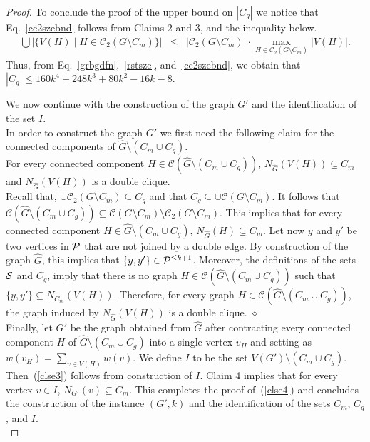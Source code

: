 \documentclass[a4paper,11pt]{article}
\newcommand{\cc}{{\mathcal{C}}}
\newcommand{\cupall}{\pmb{\pmb{\cup}}}
\begin{document}
\begin{proof}
\noindent To conclude the proof of the upper bound on $|C_{g}|$ we notice that Eq.~\eqref{cc2szebnd} follows from Claims 2 and 3, and the inequality below.
\begin{eqnarray*}
\bigcup |\{V(H)\mid H\in \cc_{2}(G\setminus C_{m})\}| & \leq & |\cc_{2}(G\setminus C_{m})|\cdot \max_{H\in \cc_{2}(G\setminus C_{m})}|V(H)|.
\end{eqnarray*}
Thus, from Eq.~\eqref{grbgdfn},~\eqref{rstsze}, and~\eqref{cc2szebnd}, we obtain that $|C_{g}|\leq 160k^{4}+248k^{3}+80k^{2}-16k-8$.


\medskip

We now continue with the construction of the graph $G'$ and the identification of the set $I$.\\

\noindent In order to construct the graph $G'$ we first need the following claim for the connected components of $\widehat{G}\setminus (C_{m}\cup C_{g})$.\\

 For every connected component $H\in \cc(\widehat{G}\setminus (C_{m}\cup C_{g}))$, $N_{\widehat{G}}(V(H))\subseteq C_{m}$ and
$N_{\widehat{G}}(V(H))$ is a double clique.\\

 Recall that, $\cupall \cc_{2}(G\setminus C_{m})\subseteq C_{g}$ and that $C_{g}\subseteq \cupall\cc(G\setminus C_{m})$. It follows that
$\cc(\widehat{G}\setminus (C_{m}\cup C_{g}))\subseteq \cc(G\setminus C_{m})\setminus \cc_{2}(G\setminus C_{m})$. 
This implies that for every connected component $H\in \widehat{G}\setminus (C_{m}\cup C_{g})$, $N_{\widehat{G}}(H)\subseteq C_{m}$.
Let now $y$ and $y'$ be two vertices in ${\cal P}$ that are not joined by a double edge. 
By construction of the graph $\widehat{G}$, this implies that $\{y,y'\}\in {\cal P}^{\leq k+1}$.
Moreover, the definitions of the sets ${\cal S}$ and $C_{g}$, imply that there is no graph $H\in \cc(\widehat{G}\setminus (C_{m}\cup C_{g}))$ such that 
$\{y,y'\}\subseteq N_{C_{m}}(V(H))$. Therefore, for every graph $H\in \cc(\widehat{G}\setminus (C_{m}\cup C_{g}))$, 
the graph induced by $N_{\widehat{G}}(V(H))$ is a double clique.
 \hfill $\diamond$\\

\noindent Finally, let $G'$ be the graph obtained from $\widehat{G}$ after contracting every connected component $H$ of $\widehat{G}\setminus (C_{m}\cup C_{g})$ 
into a single vertex $v_{H}$ and setting as $\displaystyle w(v_{H})=\sum_{v\in V(H)}w(v)$. We define $I$ to be the set $V(G')\setminus (C_{m}\cup C_{g})$. 
Then~(\ref{clse3}) follows from construction of $I$. Claim 4 implies that for every vertex $v\in I$, $N_{G'}(v)\subseteq C_{m}$. 
This completes the proof of~(\ref{clse4}) and concludes the construction of the instance 
$(G',k)$ and the identification of the sets $C_{m}$, $C_{g}$, and $I$.\\


\end{proof}
\end{document}
